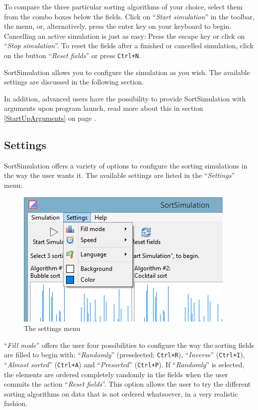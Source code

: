 \documentclass[]{pfBook}
\begin{document}
	To compare the three particular sorting algorithms of your choice, select them from the combo boxes below the fields. Click on ``\emph{Start simulation}'' in the toolbar, the menu, or, alternatively, press the enter key on your keyboard to begin. Cancelling an active simulation is just as easy: Press the escape key or click on ``\emph{Stop simulation}''. To reset the fields after a finished or cancelled simulation, click on the button ``\emph{Reset fields}'' or press \texttt{Ctrl+N}.
	
	SortSimulation allows you to configure the simulation as you wish. The available settings are discussed in the following section.
	
	In addition, advanced users have the possibility to provide SortSimulation with arguments upon program launch, read more about this in section \ref{StartUpArguments} on page \pageref{StartUpArguments}.
	
	\subsection{Settings}
	
	SortSimulation offers a variety of options to configure the sorting simulations in the way the user wants it. The available settings are listed in the ``\emph{Settings}'' menu:
	
	\begin{figure}[h]
		\centering
		\includegraphics[scale=0.6]{images/image1.png}
		\caption{The settings menu}
	\end{figure}
	
	``\emph{Fill mode}'' offers the user four possibilities to configure the way the sorting fields are filled to begin with: ``\emph{Randomly}'' (preselected; \texttt{Ctrl+R}), ``\emph{Inverse}'' (\texttt{Ctrl+I}), ``\emph{Almost sorted}'' (\texttt{Ctrl+A}) and ``\emph{Presorted}'' (\texttt{Ctrl+P}). If ``\emph{Randomly}'' is selected, the elements are ordered completely randomly in the fields when the user commits the action ``\emph{Reset fields}''. This option allows the user to try the different sorting algorithms on data that is not ordered whatsoever, in a very realistic fashion.
	
\end{document}
